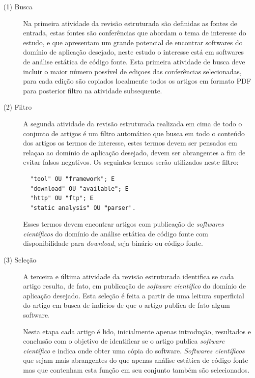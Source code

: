 \begin{description}

  \item[(1) Busca]
Na primeira atividade da revisão estruturada são definidas as fontes de entrada,
estas fontes são conferências que abordam o tema de interesse do estudo, e que
apresentam um grande potencial de encontrar softwares do domínio de aplicação
desejado, neste estudo o interesse está em softwares de análise estática de
código fonte. Esta primeira atividade de busca deve incluir o maior número
possível de ediçoes das conferências selecionadas, para cada edição são
copiados localmente todos os artigos em formato PDF para posterior filtro na
atividade subsequente.

  \item[(2) Filtro]
A segunda atividade da revisão estruturada realizada em cima de todo o conjunto
de artigos é um filtro automático que busca em todo o conteúdo dos artigos os
termos de interesse, estes termos devem ser pensados em relaçao ao domínio de
aplicação desejado, devem ser abrangentes a fim de evitar falsos negativos.
Os seguintes termos serão utilizados neste filtro:

\begin{verbatim}
  "tool" OU "framework"; E
  "download" OU "available"; E
  "http" OU "ftp"; E
  "static analysis" OU "parser".
\end{verbatim}

Esses termos devem encontrar artigos com publicação de {\it softwares
científicos} do domínio de análise estática de código fonte com disponibilidade
para {\it download}, seja binário ou código fonte.

  \item[(3) Seleção]
A terceira e última atividade da revisão estruturada
identifica se cada artigo resulta, de fato, em publicação de {\it
software científico} do domínio de aplicação desejado. Esta seleção é feita a
partir de uma leitura superficial do artigo em busca de indícios de que o
artigo publica de fato algum software.

Nesta etapa cada artigo é lido, inicialmente apenas introdução, resultados e
conclusão com o objetivo de identificar se o artigo publica {\it software
científico} e indica onde obter uma cópia do software. {\it Softwares
científicos} que sejam mais abrangentes do que apenas análise estática de
código fonte mas que contenham esta função em seu conjunto também são
selecionados.

\end{description}

